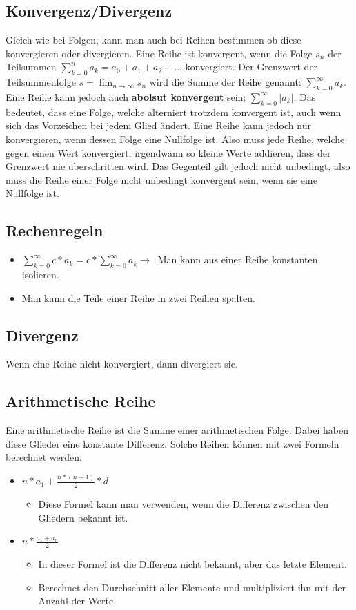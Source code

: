 \documentclass{article}
\begin{document}
	\subsection{Konvergenz/Divergenz}
	Gleich wie bei Folgen, kann man auch bei Reihen bestimmen ob diese konvergieren oder divergieren. Eine Reihe ist konvergent, wenn die Folge $s_n$ der Teilsummen $\sum^{n}_{k=0}a_k=a_0+a_1+a_2+...$ konvergiert. Der Grenzwert der Teilsummenfolge $s=\lim_{n\to\infty}s_n$ wird die Summe der Reihe genannt: $\sum^{\infty}_{k=0}a_k$. \\
	Eine Reihe kann jedoch auch \textbf{abolsut konvergent} sein: $\sum^{\infty}_{k=0}|a_k|$. Das bedeutet, dass eine Folge, welche alterniert trotzdem konvergent ist, auch wenn sich das Vorzeichen bei jedem Glied ändert. Eine Reihe kann jedoch nur konvergieren, wenn dessen Folge eine Nullfolge ist. Also muss jede Reihe, welche gegen einen Wert konvergiert, irgendwann so kleine Werte addieren, dass der Grenzwert nie überschritten wird. Das Gegenteil gilt jedoch nicht unbedingt, also muss die Reihe einer Folge nicht unbedingt konvergent sein, wenn sie eine Nullfolge ist. \\
	\subsection{Rechenregeln}
	\begin{itemize}
		\item{$\sum^{\infty}_{k=0}c*a_k=c*\sum^{\infty}_{k=0}a_k\to\ $ Man kann aus einer Reihe konstanten isolieren.}
		\item{Man kann die Teile einer Reihe in zwei Reihen spalten.}
	\end{itemize}
	\subsection{Divergenz}
	Wenn eine Reihe nicht konvergiert, dann divergiert sie.
	\subsection{Arithmetische Reihe}
	Eine arithmetische Reihe ist die Summe einer arithmetischen Folge. Dabei haben diese Glieder eine konstante Differenz. Solche Reihen können mit zwei Formeln berechnet werden.
	\begin{itemize}
		\item{$n*a_1+\frac{n*(n-1)}{2}*d$}
		\begin{itemize}
			\item{Diese Formel kann man verwenden, wenn die Differenz zwischen den Gliedern bekannt ist.}
		\end{itemize}
		\item{$n*\frac{a_1+a_n}{2}$}
		\begin{itemize}
			\item{In dieser Formel ist die Differenz nicht bekannt, aber das letzte Element.}
			\item{Berechnet den Durchschnitt aller Elemente und multipliziert ihn mit der Anzahl der Werte.}
		\end{itemize}
	\end{itemize}
\end{document}
